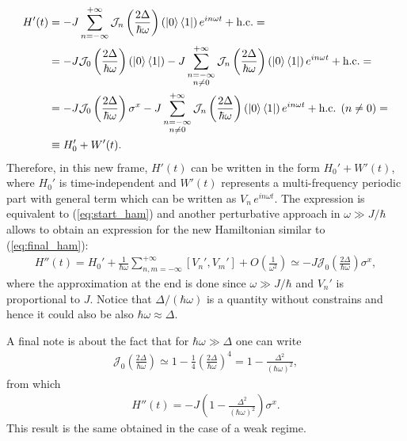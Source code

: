 \begin{tcolorbox}
\begin{align*}
    H'(t) &= -J \sum_{n = -\infty}^{+\infty} \mathcal{J}_n\left( \frac{2 \Delta}{\hbar \omega} \right) (\ket{0}\bra{1})\, e^{i n \omega t} + \text{h.c.} = \\
    &= -J \mathcal{J}_0 \left( \frac{2 \Delta}{\hbar \omega} \right) (\ket{0}\bra{1}) -J \sum\limits_{\substack{n=-\infty \\ n\neq 0}}^{+\infty} \mathcal{J}_n\left( \frac{2 \Delta}{\hbar \omega} \right) (\ket{0}\bra{1}) \, e^{i n \omega t} + \text{h.c.} = \\
     &= -J \mathcal{J}_0 \left( \frac{2 \Delta}{\hbar \omega} \right) \sigma^x -J \sum\limits_{\substack{n=-\infty \\ n\neq 0}}^{+\infty} \mathcal{J}_n\left( \frac{2 \Delta}{\hbar \omega} \right) (\ket{0}\bra{1}) \, e^{i n \omega t} + \text{h.c. ($n \neq 0$)} = \\
     &\equiv H_0' + W'(t). 
\end{align*}
Therefore, in this new frame, $H'(t)$ can be written in the form $H_0' + W'(t)$, where $H_0'$ is time-independent and $W'(t)$ represents a multi-frequency periodic part with general term which can be written as $V_n \, e^{i n \omega t}$. The expression is equivalent to (\ref{eq:start_ham}) and another perturbative approach in $\omega \gg J/\hbar$ allows to obtain an expression for the new Hamiltonian similar to (\ref{eq:final_ham}): 
\begin{align}
    H''(t) = H_0' + \frac{1}{\hbar \omega} \sum_{n,m= -\infty}^{+\infty} [V_n',V_m']  + O\left( \frac{1}{\omega^2}\right) \simeq - J \mathcal{J}_0\left( \frac{2 \Delta}{\hbar \omega} \right) \sigma^x, 
\end{align}
where the approximation at the end is done since $\omega \gg J/\hbar$ and $V_n'$ is proportional to $J$. Notice that $\Delta/(\hbar \omega)$ is a quantity without constrains and hence it could also be also $\hbar \omega \approx \Delta $. 

A final note is about the fact that for $\hbar \omega \gg \Delta$ one can write
\begin{align*}
    \mathcal{J}_0 \left( \frac{2 \Delta}{\hbar \omega} \right) \simeq 1 - \frac{1}{4}\left( \frac{2 \Delta}{\hbar \omega} \right)^4 = 1 - \frac{\Delta^2}{(\hbar \omega)^2}, 
\end{align*}
from which 
\begin{align*}
    H''(t) = -J \left(  1 - \frac{\Delta^2}{(\hbar \omega)^2} \right) \sigma^x.
\end{align*}
This result is the same obtained in the case of a weak regime. 
\end{tcolorbox}






